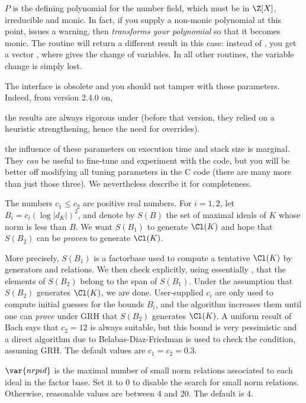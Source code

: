 $P$ is the defining polynomial for the number field, which must be in
$\Z[X]$, irreducible and monic. In fact, if you supply a non-monic polynomial
at this point,  issues a warning, then \emph{transforms your
polynomial} so that it becomes monic. The  routine
will return a different result in this case: instead of , you get a
vector , where  gives the change
of variables. In all other routines, the variable change is simply lost.

The  interface is obsolete and you should not tamper with
these parameters. Indeed, from version 2.4.0 on,

\item the results are always rigorous under  (before that version,
they relied on a heuristic strengthening, hence the need for overrides).

\item the influence of these parameters on execution time and stack size is
marginal. They \emph{can} be useful to fine-tune and experiment with the
 code, but you will be better off modifying all tuning
parameters in the C code (there are many more than just those three).
We nevertheless describe it for completeness.

The numbers $c_1 \leq c_2$ are positive real numbers. For $i = 1,2$, let $B_i
= c_i(\log |d_K|)^2$, and denote by $S(B)$ the set of maximal ideals of $K$
whose norm is less than $B$. We want $S(B_1)$ to generate $\Cl(K)$ and hope
that $S(B_2)$ can be \emph{proven} to generate $\Cl(K)$.

More precisely, $S(B_1)$ is a factorbase used to compute a tentative
$\Cl(K)$ by generators and relations. We then check explicitly, using
essentially , that the elements of $S(B_2)$ belong to the
span of $S(B_1)$. Under the assumption that $S(B_2)$ generates $\Cl(K)$, we
are done. User-supplied $c_i$ are only used to compute initial guesses for
the bounds $B_i$, and the algorithm increases them until one can \emph{prove}
under GRH that $S(B_2)$ generates $\Cl(K)$. A uniform result of Bach says
that $c_2 = 12$ is always suitable, but this bound is very pessimistic and a
direct algorithm due to Belabas-Diaz-Friedman is used to check the condition,
assuming GRH. The default values are $c_1 = c_2 = 0.3$.

$\var{nrpid}$ is the maximal number of small norm relations associated to each
ideal in the factor base. Set it to $0$ to disable the search for small norm
relations. Otherwise, reasonable values are between 4 and 20. The default is
4.

